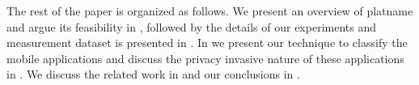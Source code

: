 
The rest of the paper is organized as follows. 
We present an overview of platname and argue its feasibility in , followed by the details of our experiments and measurement dataset is presented in .
In   we present our technique to classify the mobile applications and discuss the privacy invasive nature of these applications in . 
We discuss the related work in  and our conclusions in .



